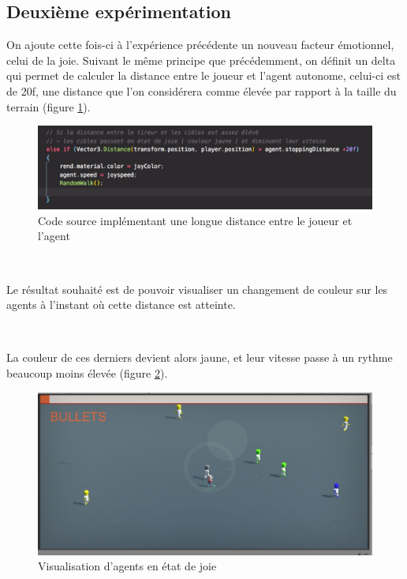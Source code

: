 \subsection{Deuxième expérimentation}

On ajoute cette fois-ci à l'expérience précédente un nouveau facteur émotionnel, celui de la joie.
Suivant le même principe que précédemment, on définit un delta qui permet de calculer la distance entre le joueur et l’agent autonome, celui-ci est de 20f, une distance que l'on considérera comme élevée par rapport à la taille du terrain (figure \ref{fig:fonct2}).

\begin{figure}[th]
\centering
\includegraphics{Figures/fonct2.JPG}
\decoRule
\caption[Code source implémentant une longue distance]{Code source implémentant une longue distance entre le joueur et l'agent}
\label{fig:fonct2}
\end{figure}



~\par
Le résultat souhaité est de pouvoir visualiser un changement de couleur sur les agents à l’instant où cette distance est atteinte.

~\par
La couleur de ces derniers devient alors jaune, et leur vitesse passe à un rythme beaucoup moins élevée (figure \ref{fig:bichi2}).

\begin{figure}[th]
\centering
\includegraphics{Figures/bichi2.JPG}
\decoRule
\caption[Visualisation d'agents en état de joie]{Visualisation d'agents en état de joie}
\label{fig:bichi2}
\end{figure}


